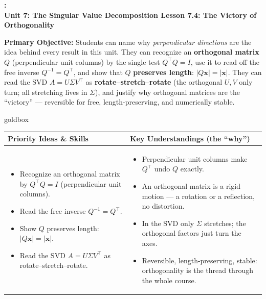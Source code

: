\documentclass[10pt]{article}
\newcommand{\xx}{\mathbf{x}}
\newcommand{\T}{^{\top}}
\newcommand{\UnitNumberName}{Unit 7: The Singular Value Decomposition \quad}
\newcommand{\LessonNumberName}{Lesson 7.4: The Victory of Orthogonality}
\begin{document}
\begin{center}
    {\Large\bfseries \CourseName: \SchoolYear \\
    {\small\bfseries \UnitNumberName \LessonNumberName}}
\end{center}

\begin{tcolorbox}[colback=blush, colframe=burgundy, boxrule=0.9pt, arc=2mm,
    left=2mm, right=2mm, top=1.5mm, bottom=1.5mm]
    \textbf{Primary Objective:} Students can name why \emph{perpendicular directions} are the idea behind
    every result in this unit. They can recognize an \textbf{orthogonal matrix} $Q$ (perpendicular unit
    columns) by the single test $Q\T Q=I$, use it to read off the free inverse $Q^{-1}=Q\T$, and show that
    $Q$ \textbf{preserves length}: $|Q\xx|=|\xx|$. They can read the SVD $A=U\Sigma V\T$ as
    \textbf{rotate--stretch--rotate} (the orthogonal $U,V$ only turn; all stretching lives in $\Sigma$), and
    justify why orthogonal matrices are the ``victory'' --- reversible for free, length-preserving, and
    numerically stable.
\end{tcolorbox}

\renewcommand{\arraystretch}{1.4}
\begin{skillbox}{goldbox}
\begin{tabularx}{\linewidth}{@{}X|X@{}}
\textbf{Priority Ideas \& Skills} & \textbf{Key Understandings (the ``why'')} \\[2pt]
\hline
\vspace{-6pt}
\begin{itemize}[leftmargin=1.1em, nosep, after=\vspace{2pt}]
  \item Recognize an orthogonal matrix by $Q\T Q=I$ (perpendicular unit columns).
  \item Read the free inverse $Q^{-1}=Q\T$.
  \item Show $Q$ preserves length: $|Q\xx|=|\xx|$.
  \item Read the SVD $A=U\Sigma V\T$ as rotate--stretch--rotate.
\end{itemize}
&
\vspace{-6pt}
\begin{itemize}[leftmargin=1.1em, nosep, after=\vspace{2pt}]
  \item Perpendicular unit columns make $Q\T$ undo $Q$ exactly.
  \item An orthogonal matrix is a rigid motion --- a rotation or a reflection, no distortion.
  \item In the SVD only $\Sigma$ stretches; the orthogonal factors just turn the axes.
  \item Reversible, length-preserving, stable: orthogonality is the thread through the whole course.
\end{itemize}
\end{tabularx}
\end{skillbox}
\end{document}
